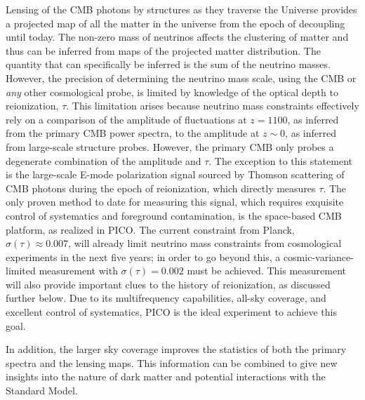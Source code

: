 \documentclass[PICOReport.tex]{subfiles}
\begin{document}

Lensing of the CMB photons by structures as they traverse the Universe provides a projected map of all the matter 
in the universe from the epoch of decoupling until today.  The non-zero mass of neutrinos affects the clustering of 
matter and thus can be inferred from maps of the projected matter distribution. The quantity that can specifically be 
inferred is the sum of the neutrino masses.  
However, the precision of determining 
the neutrino mass scale, using the CMB or {\it any} other cosmological probe, is limited by knowledge of 
the optical depth to reionization, $\tau$.   
 This limitation arises because neutrino mass constraints effectively 
rely on a comparison of the amplitude of fluctuations at $z=1100$, as inferred from the primary 
CMB power spectra, to the amplitude at $z \sim 0$, as inferred from large-scale structure probes.  
However, the primary CMB only probes a degenerate combination of the amplitude and $\tau$.  
The exception to this statement is the large-scale E-mode polarization signal sourced by Thomson 
scattering of CMB photons during the epoch of reionization, which directly measures $\tau$.  
The only proven method to date for measuring this signal, which requires exquisite control of systematics 
and foreground contamination, is the space-based CMB platform, as realized in PICO.  
The current constraint from Planck, $\sigma(\tau) \approx 0.007$, will already limit neutrino mass 
constraints from cosmological experiments in the next five years; in order to go beyond this, a 
cosmic-variance-limited measurement with $\sigma(\tau) = 0.002$ must be achieved. 
This measurement will also provide important clues to the history of reionization, as discussed further below.  
Due to its multifrequency capabilities, all-sky coverage, and excellent control of systematics, 
PICO is the ideal experiment to achieve this goal.

In addition, the larger sky coverage improves the statistics of both the primary spectra and the lensing maps.  
This information can be combined to give new insights into the nature of dark matter and potential interactions 
with the Standard Model. 
\end{document}
